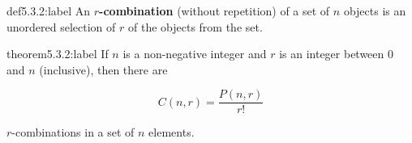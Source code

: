 \begin{definition}{def5.3.2:label}
    An \textbf{$r$-combination} (without repetition) of a set of $n$ objects is an unordered selection of $r$ of the objects from the set.
\end{definition}


\begin{theorem}{theorem5.3.2:label}
    If $n$ is a non-negative integer and $r$ is an integer between 0 and $n$ (inclusive), then there are 
    
    $$
    C(n,r) = \frac{P(n,r)}{r!}
    $$

    $r$-combinations in a set of $n$ elements.
\end{theorem}